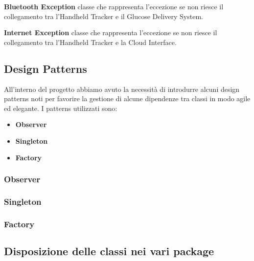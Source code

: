 \documentclass[twocolumn]{article}
\begin{document}
\textbf{Bluetooth Exception}
\newline classe che rappresenta l'eccezione se non riesce il collegamento tra l'Handheld Tracker e il Glucose Delivery System.

\textbf{Internet Exception}
\newline  classe che rappresenta l'eccezione se non riesce il collegamento tra l'Handheld Tracker e la Cloud Interface.


\subsection{Design Patterns}
All’interno del progetto abbiamo avuto la necessità di introdurre alcuni design patterns noti per favorire la gestione di alcune dipendenze tra classi in modo agile ed elegante. I patterns utilizzati sono:
\begin{itemize}
    \setlength\itemsep{0em}
    \item \textbf{Observer}
    \item \textbf{Singleton}
    \item \textbf{Factory}
\end{itemize}

\subsubsection{Observer}



\newpage
\subsubsection{Singleton}


\subsubsection{Factory}


\subsection{Disposizione delle classi nei vari package}
\end{document}
